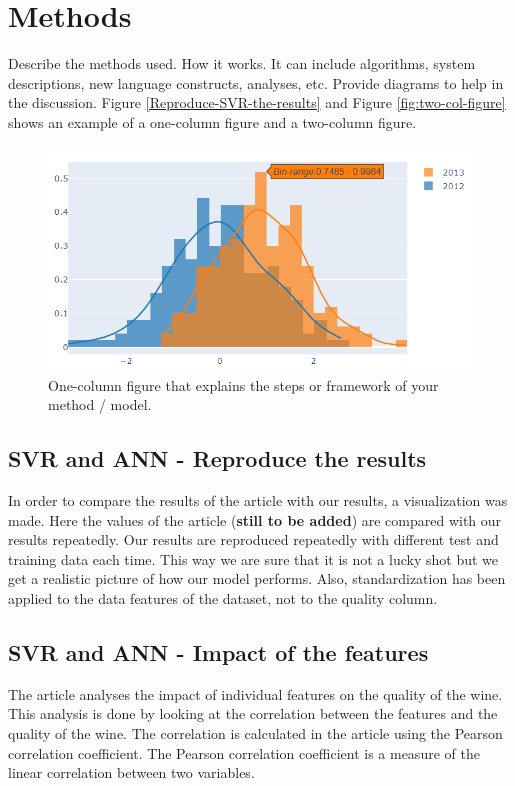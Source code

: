 \documentclass{article}
\begin{document}
\section{Methods}
Describe the methods used. How it works. It can include algorithms, system descriptions, new language constructs, analyses, etc.
Provide diagrams to help in the discussion. Figure \ref{Reproduce-SVR-the-results} and Figure \ref{fig:two-col-figure} shows an example of a one-column figure and a two-column figure. 
\begin{figure}
    \centering
    \includegraphics[width=\linewidth]{figures/example_plot.png}
    \caption{One-column figure that explains the steps or framework of your method / model.}
    \label{fig:one-col-figure}
\end{figure}

\subsection{SVR and ANN - Reproduce the results}
In order to compare the results of the article with our results, a visualization was made. Here the values of the article (\textbf{still to be added}) are compared with our results repeatedly. Our results are reproduced repeatedly with different test and training data each time. This way we are sure that it is not a lucky shot but we get a realistic picture of how our model performs.
Also, standardization has been applied to the data features of the dataset, not to the quality column.

\subsection{SVR and ANN - Impact of the features}
The article analyses the impact of individual features on the quality of the wine.
This analysis is done by looking at the correlation between the features and the quality of the wine.
The correlation is calculated in the article using the Pearson correlation coefficient.
The Pearson correlation coefficient is a measure of the linear correlation between two variables.
\end{document}
